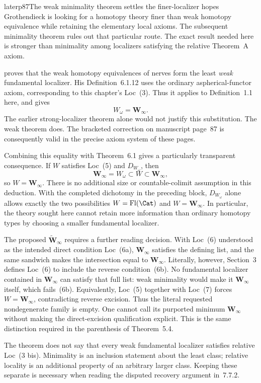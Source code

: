 \begin{dcomment}{later}{p87}{The weak minimality theorem settles the finer-localizer hopes}
Grothendieck is looking for a homotopy theory finer than weak homotopy equivalence while retaining the elementary local axioms. The subsequent minimality theorem rules out that particular route. The exact result needed here is stronger than minimality among localizers satisfying the relative Theorem~A axiom.

\citet[Theorem~6.1.18, pp.~242--243]{Cisinski2006} proves that the weak homotopy equivalences of nerves form the least \emph{weak} fundamental localizer. His Definition~6.1.12 uses the ordinary aspherical-functor axiom, corresponding to this chapter's Loc~(3). Thus it applies to Definition~1.1 here, and gives
\[
 W_\omega=\mathbf W_\infty.
\]
The earlier strong-localizer theorem alone would not justify this substitution. The weak theorem does. The bracketed correction on manuscript page~87 is consequently valid in the precise axiom system of these pages.

Combining this equality with Theorem~6.1 gives a particularly transparent consequence. If $W$ satisfies Loc~(5) and $D_{W_\omega}$, then
\[
 \mathbf W_\infty=W_\omega\subset W\subset\mathbf W_\infty,
\]
so $W=\mathbf W_\infty$. There is no additional size or countable-colimit assumption in this deduction. With the completed dichotomy in the preceding block, $D_{W_\omega}$ alone allows exactly the two possibilities $W=\operatorname{Fl}(\Cat)$ and $W=\mathbf W_\infty$. In particular, the theory sought here cannot retain more information than ordinary homotopy types by choosing a smaller fundamental localizer.

The proposed $\widetilde{\mathbf W}_\infty$ requires a further reading decision. With Loc~(6) understood as the intended direct condition Loc~(6a), $\mathbf W_\infty$ satisfies the defining list, and the same sandwich makes the intersection equal to $\mathbf W_\infty$. Literally, however, Section~3 defines Loc~(6) to include the reverse condition~(6b). No fundamental localizer contained in $\mathbf W_\infty$ can satisfy that full list: weak minimality would make it $\mathbf W_\infty$ itself, which fails~(6b). Equivalently, Loc~(5) together with Loc~(7) forces $W=\mathbf W_\infty$, contradicting reverse excision. Thus the literal requested nondegenerate family is empty. One cannot call its purported minimum $\mathbf W_\infty$ without making the direct-excision qualification explicit. This is the same distinction required in the parenthesis of Theorem~5.4.

The theorem does not say that every weak fundamental localizer satisfies relative Loc~(3 bis). Minimality is an inclusion statement about the least class; relative locality is an additional property of an arbitrary larger class. Keeping these separate is necessary when reading the disputed recovery argument in~7.7.2.
\end{dcomment}

